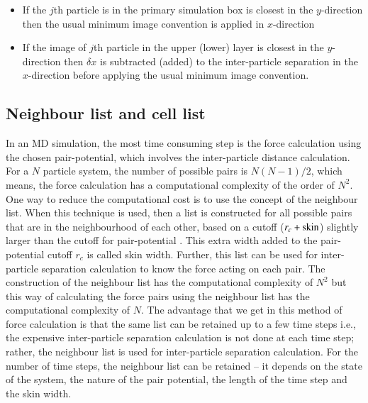     \begin{itemize}
        \item If the $j$th particle is in the primary simulation box is closest in the $y$-direction then the usual minimum image convention is applied in $x$-direction
        \item If the image of $j$th particle in the upper (lower) layer is closest in the $y$-direction then $\delta x$ is subtracted (added) to the inter-particle separation in the $x$-direction before applying the usual minimum image convention.
    \end{itemize}
    
    \subsection{Neighbour list and cell list}
    In an MD simulation, the most time consuming step is the force calculation using the chosen pair-potential, which involves the inter-particle distance calculation. For a $N$ particle system, the number of possible pairs is $N(N-1)/2$, which means, the force calculation has a computational complexity of the order of $N^2$. One way to reduce the computational cost is to use the concept of the neighbour list. When this technique is used, then a list is constructed for all possible pairs that are in the neighbourhood of each other, based on a cutoff ($r_c + {\rm skin}$) slightly larger than the cutoff for pair-potential \cite{allen2017,frenkel2001understanding,grest1989vectorized}.  This extra width added to the pair-potential cutoff $r_c$ is called skin width. Further, this list can be used for inter-particle separation calculation to know the force acting on each pair. The construction of the neighbour list has the computational complexity of $N^2$ but this way of calculating the force pairs using the neighbour list has the computational complexity of $N$. The advantage that we get in this method of force calculation is that the same list can be retained up to a few time steps i.e., the expensive inter-particle separation calculation is not done at each time step; rather, the neighbour list is used for inter-particle separation calculation. For the number of time steps, the neighbour list can be retained -- it depends on the state of the system, the nature of the pair potential, the length of the time step and the skin width. %
    

